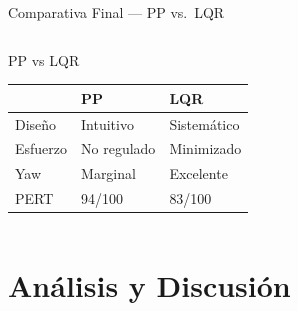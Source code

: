 \documentclass[mathserif,spanish,10pt]{beamer}
\begin{document}
\begin{frame}{Comparativa Final --- PP vs.\ LQR}
\begin{columns}[T]
    \begin{block}{\small PP vs LQR}
      \centering\scriptsize
      \vspace{4pt}
      \begin{tabular}{p{1.0cm}p{1.4cm}p{1.4cm}}
        \toprule
        & \textbf{PP} & \textbf{LQR} \\
        \midrule
        Diseño       & Intuitivo  & Sistemático \\
        Esfuerzo     & No regulado & Minimizado \\
        Yaw          & Marginal   & Excelente \\
        PERT         & 94/100     & 83/100 \\
        \bottomrule
      \end{tabular}
    \end{block}
  \end{columns}
\end{frame}

\section{Análisis y Discusión}
\end{document}

